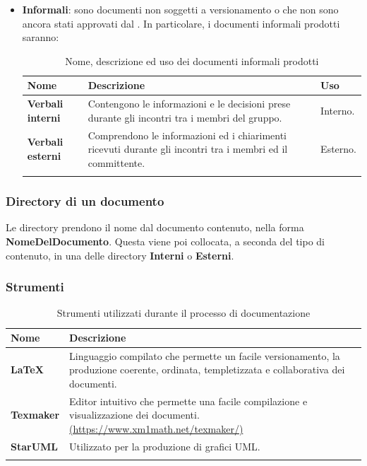 {{\begin{itemize}
\item \textbf{Informali}: sono documenti non soggetti a versionamento o che non sono ancora stati approvati dal \RdP{}. \newline 
In particolare, i documenti informali prodotti saranno:
{
	\setlength{\freewidth}{\dimexpr\textwidth-1\tabcolsep}
	\renewcommand{\arraystretch}{1.5}
	\setlength{\aboverulesep}{0pt}
	\setlength{\belowrulesep}{0pt}
	\begin{longtable}{L{.210\freewidth} L{.6\freewidth} L{.080\freewidth}}
		\textbf{Nome} & \textbf{Descrizione} & \textbf{Uso}\\
		\toprule
		\endhead		
		\textbf{Verbali interni} & Contengono le informazioni e le decisioni prese durante gli incontri tra i membri del gruppo. & Interno. \\ 
		\textbf{Verbali esterni} & Comprendono le informazioni ed i chiarimenti ricevuti durante gli incontri tra i membri ed il committente. & Esterno. \\
		\bottomrule
		\hiderowcolors
		\caption{Nome, descrizione ed uso dei documenti informali prodotti}
	\end{longtable}
}
\end{itemize}
\subsubsection*{Directory di un documento}
Le directory prendono il nome dal documento contenuto, nella forma \textbf{NomeDelDocumento}. Questa viene poi collocata, a seconda del tipo di contenuto, in una delle directory \textbf{Interni} o \textbf{Esterni}. 

\subsubsection{Strumenti}

	\setlength{\freewidth}{\dimexpr\textwidth-1\tabcolsep}
	\renewcommand{\arraystretch}{1.5}
	\setlength{\aboverulesep}{0pt}
	\setlength{\belowrulesep}{0pt}
	\begin{longtable}{L{.210\freewidth} L{.75\freewidth} L{.080\freewidth}}
		\textbf{Nome} & \textbf{Descrizione} \\
		\toprule
		\endhead		
		\textbf{\LaTeX} & Linguaggio compilato che permette un facile versionamento, la produzione coerente, ordinata, templetizzata e collaborativa dei documenti. \\
		\textbf{Texmaker} & Editor intuitivo che permette una facile compilazione e visualizzazione dei documenti. \newline \url{(https://www.xm1math.net/texmaker/)}\\
		\textbf{StarUML} & Utilizzato per la produzione di grafici UML.\\
		\bottomrule
		\hiderowcolors
		\caption{Strumenti utilizzati durante il processo di documentazione}
	\end{longtable}


}}
